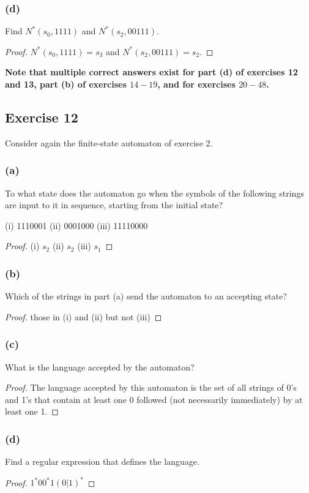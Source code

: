 \documentclass[14pt]{extarticle}
\newcommand{\cy}{\color{cyan}}
\begin{document}
\subsubsection{(d)}
Find \(N^*(s_0, 1111)\) and \(N^*(s_2, 00111)\).
\begin{proof}
\(N^*(s_0, 1111) = s_3\) and \(N^*(s_2, 00111) = s_2\).
\end{proof}

{\bf \cy Note that multiple correct answers exist for part (d) of exercises 12 and 13, part (b) of exercises \(14-19\), and 
for exercises \(20-48\).}

\subsection{Exercise 12}
Consider again the finite-state automaton of exercise 2.

\subsubsection{(a)}
To what state does the automaton go when the symbols of the following strings are input to it in sequence, starting from 
the initial state? 

(i) 1110001 (ii) 0001000 (iii) 11110000

\begin{proof}
(i) \(s_2\) (ii) \(s_2\) (iii) \(s_1\)
\end{proof}

\subsubsection{(b)}
Which of the strings in part (a) send the automaton to an accepting state?

\begin{proof}
those in (i) and (ii) but not (iii)
\end{proof}

\subsubsection{(c)}
What is the language accepted by the automaton?
\begin{proof}
The language accepted by this automaton is the set of all strings of 0’s and 1’s that contain at least one 0 followed 
(not necessarily immediately) by at least one 1.
\end{proof}

\subsubsection{(d)}
Find a regular expression that defines the language.
\begin{proof}
\(1^*00^*1(0 | 1)^*\)
\end{proof}
\end{document}
